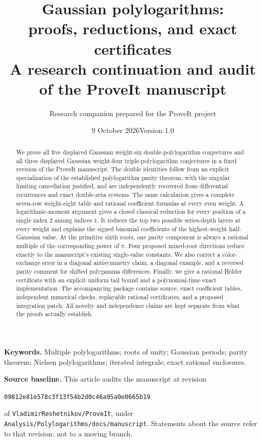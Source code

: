 \documentclass[11pt,a4paper]{article}
\title{\vspace{-12mm}\textbf{Gaussian polylogarithms:\\[3pt] proofs, reductions, and exact certificates}\\[7pt]
\large A research continuation and audit of the ProveIt manuscript}
\author{Research companion prepared for the ProveIt project}
\date{9 October 2026\quad\textbullet\quad Version 1.0}
\theoremstyle{definition}
\theoremstyle{remark}
\numberwithin{equation}{section}
\begin{document}
\maketitle
\thispagestyle{plain}
\begin{abstract}
We prove all five displayed Gaussian weight-six double-polylogarithm
conjectures and all three displayed Gaussian weight-four triple-polylogarithm
conjectures in a fixed revision of the ProveIt manuscript. The double
identities follow from an explicit specialization of the established
polylogarithm parity theorem, with the singular limiting cancellation
justified, and are independently recovered from differential recurrences
and exact double-zeta systems. The same calculation gives a complete
seven-row weight-eight table and rational coefficient formulas at every
even weight. A logarithmic-moment argument gives a closed classical
reduction for every position of a single index $2$ among indices $1$.
It reduces the top two possible series-depth layers at every weight and
explains the signed binomial coefficients of the highest-weight
half-Gaussian value. At the primitive sixth roots, one parity component
is always a rational multiple of the corresponding power of $\pi$.
Four proposed mixed-root directions reduce exactly
to the manuscript's existing single-value constants. We also correct a
color-exchange error in a diagonal antisymmetry claim, a diagonal example,
and a reversed parity comment for shifted polygamma differences.
Finally, we give a rational H\"older certificate with an explicit uniform
tail bound and a polynomial-time exact implementation. The accompanying
package contains source, exact coefficient tables, independent numerical
checks, replayable rational certificates, and a proposed integration patch.
All novelty and independence claims are kept separate from what the
proofs actually establish.
\end{abstract}

\noindent\textbf{Keywords.} Multiple polylogarithms; roots of unity;
Gaussian periods; parity theorem; Nielsen polylogarithms; iterated
integrals; exact rational enclosures.

\medskip
\noindent\textbf{Source baseline.} This article audits the manuscript at
revision
\begin{center}
\small\texttt{09812e81e578c3f13f54b2d0c46a95a0e0665b19}
\end{center}
of \texttt{VladimirReshetnikov/ProveIt}, under
\texttt{Analysis/Polylogarithms/docs/manuscript}. Statements about the
source refer to that revision, not to a moving branch.

\clearpage
\begingroup
\small
\setlength{\parskip}{0pt}
\tableofcontents
\endgroup
\clearpage









\end{document}

